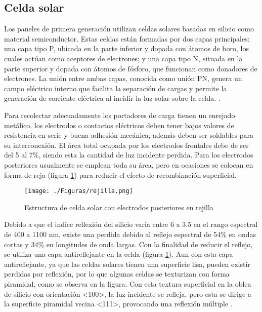  \subsection{Celda solar}
\label{sec:Celda solar}

Los paneles de primera generación utilizan celdas solares basadas en silicio como material semiconductor. Estas celdas están formadas por dos capas principales: una capa tipo P, ubicada en la parte inferior y dopada con átomos de boro, los cuales actúan como aceptores de electrones; y una capa tipo N, situada en la parte superior y dopada con átomos de fósforo, que funcionan como donadores de electrones. La unión entre ambas capas, conocida como unión PN, genera un campo eléctrico interno que facilita la separación de cargas y permite la generación de corriente eléctrica al incidir la luz solar sobre la celda. \citep{PVeducation2021}. 

Para recolectar adecuadamente los portadores de carga tienen un enrejado metálico, los electrodos o contactos eléctricos deben tener bajos valores de resistencia en serie y buena adhesión mecánica, además deben ser soldables para su interconexión. El área total ocupada por los electrodos frontales debe de ser del 5 al 7\%, siendo esta la cantidad de luz incidente perdida. Para los electrodos posteriores usualmente se emplean toda su área, pero en ocasiones se colocan en forma de reja (figura \ref{fig:rejilla}) para reducir el efecto de recombinación superficial.

    \begin{figure}[htb]
  	\begin{center}
  		\texttt{[image: ./Figuras/rejilla.png]}
  	\end{center}
  	\vspace{-1em} %
  	\caption{Estructura de celda solar con electrodos posteriores en rejilla \citep{Yasuhiro2011}}
  	\label{fig:rejilla}
  \end{figure}
  
Debido a que el indice reflexión del silicio varia entre 6 a 3.5 en el rango espectral de 400 a 1100 nm, existe una perdida debido al reflejo espectral de 54\% en ondas cortas y 34\% en longitudes de onda largas. Con la finalidad de reducir el reflejo, se utiliza una capa antireflejante en la celda (figura \ref{fig:rejilla}). Aun con esta capa antireflejante, ya que las celdas solares tienen una superficie lisa, pueden existir perdidas por reflexión, por lo que algunas celdas se texturizan con forma piramidal, como se observa en la figura. Con esta textura superficial en la oblea de silicio con orientación <100>, la luz incidente se refleja, pero esta se dirige a la superficie piramidal vecina <111>, provocando una reflexión múltiple \citep{Yasuhiro2011}. 

